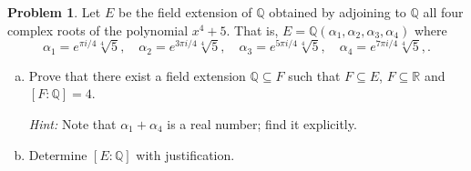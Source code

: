 \documentclass[11pt]{article}
\newcommand{\Q}{\mathbb{Q}}
\newcommand{\R}{\mathbb{R}}
\theoremstyle{definition}
\newtheorem{problem}{Problem}
\begin{document}
\begin{problem}
Let $E$ be the field extension of $\Q$ obtained by adjoining to $\Q$ all four complex roots of the polynomial $x^4 + 5$. 
That is, $E = \Q(\alpha_1, \alpha_2, \alpha_3, \alpha_4)$ where
$$\alpha_1 = e^{\pi i/4}\sqrt[4]{5}, \quad
\alpha_2 = e^{3\pi i/4}\sqrt[4]{5}, \quad
\alpha_3 = e^{5\pi i/4}\sqrt[4]{5}, \quad
\alpha_4 = e^{7\pi i/4}\sqrt[4]{5},.$$

\begin{enumerate}[a)]
\item Prove that there exist a field extension $\Q \subseteq F$ such that $F \subseteq E$, $F \subseteq \R$ and $[F :\Q]=4$.

{\em Hint:} Note that $\alpha_1 + \alpha_4$ is a real number; find it explicitly. 

\item Determine $[E : \Q]$ with justification.

\end{enumerate}
\end{problem}
\end{document}

